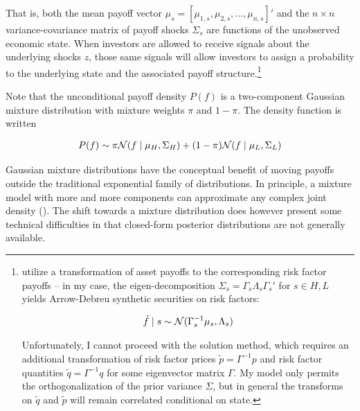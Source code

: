 \documentclass{article}
\begin{document}
\noindent That is, both the mean payoff vector $\mu_s = [\mu_{1,s},\mu_{2,s},\dots,\mu_{n,s}]'$ and the  $n\times n$ variance-covariance matrix of payoff shocks $\Sigma_s$ are functions of the unobserved economic state. When investors are allowed to receive signals about the underlying shocks $z$, those same signals will allow investors to assign a probability to the underlying state and the associated payoff structure.\footnote{\textcite{kacperczyk_rational_2016} utilize a transformation of asset payoffs to the corresponding risk factor payoffs -- in my case, the eigen-decomposition $\Sigma_s = \Gamma_s \Lambda_s \Gamma_s'$ for $s \in {H,L}$ yields Arrow-Debreu synthetic securities on risk factors:

\begin{align}
    \tilde f \mid s \sim \mathcal{N}(\Gamma_s^{-1} \mu_s, \Lambda_s)
\end{align}

\noindent Unfortunately, I cannot proceed with the \textcite{kacperczyk_rational_2016} solution method, which requires an additional transformation of risk factor prices $\tilde p = \Gamma^{-1}p$ and risk factor quantities $\tilde q = \Gamma^{-1} q$ for some eigenvector matrix $\Gamma$. My model only permits the orthogonalization of the prior variance $\Sigma$, but in general the transforms on $\tilde q$ and $\tilde p$ will remain correlated conditional on state.


}

Note that the unconditional payoff density $P(f)$ is a two-component Gaussian mixture distribution with mixture weights $\pi$ and $1-\pi$. The density function is written

\begin{align}
    P(f) \sim \pi \mathcal{N}(f \mid \mu_H, \Sigma_H) + (1-\pi) \mathcal{N} (f \mid \mu_L, \Sigma_L)
\end{align}

\noindent Gaussian mixture distributions have the conceptual benefit of moving payoffs outside the traditional exponential family of distributions. In principle, a mixture model with more and more components can approximate any complex joint density (\cite{nguyen_approximations_2019}). The shift towards a mixture distribution does however present some technical difficulties in that closed-form posterior distributions are not generally available.
\end{document}

